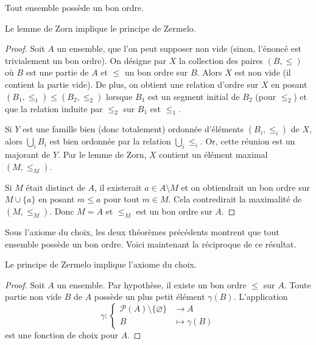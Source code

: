 \begin{definition}\label{ens : choix : zermelo}
	Tout ensemble possède un bon ordre. 
\end{definition}
\begin{proposition}
    
    Le lemme de Zorn implique le principe de Zermelo.
\end{proposition}
\begin{proof}
	Soit $A$ un ensemble, que l'on peut supposer non vide (sinon, l'énoncé est trivialement un bon ordre). On désigne par $X$ la collection des paires $(B, \leqslant)$ où $B$ est une partie de $A$ et $\leqslant$ un bon ordre sur $B$. Alors $X$ est non vide (il contient la partie vide). De plus, on obtient une relation d'ordre sur $X$ en posant $(B_1, \leqslant_1) \leqslant (B_2, \leqslant_2)$ lorsque $B_1$ est un segment initial de $B_2$ (pour $\leqslant_2$) et que la relation induite par $\leqslant_2$ sur $B_1$ est $\leqslant_1$.

	Si $Y$ est une famille bien (donc totalement) ordonnée d'éléments $(B_i, \leqslant_i)$ de $X$, alors $\bigcup_i B_i$ est bien ordonnée par la relation $\bigcup_i \leqslant_i$. Or, cette réunion est un majorant de $Y$. Par le lemme de Zorn, $X$ contient un élément maximal $(M, \leqslant_M)$.

	Si $M$ était distinct de $A$, il existerait $a \in A \setminus M$ et on obtiendrait un bon ordre sur $M \cup \{a\}$ en posant $m \leqslant a$ pour tout $m \in M$. Cela contredirait la maximalité de $(M, \leqslant_M)$. Donc $M = A$ et $\leqslant_M$ est un bon ordre sur $A$.
\end{proof}

Sous l'axiome du choix, les deux théorèmes précédents montrent que tout ensemble possède un bon ordre. Voici maintenant la réciproque de ce résultat.

\begin{theoreme}\label{ens : choix :zermelo_implique_choix}
	Le principe de Zermelo implique l'axiome du choix.
\end{theoreme}

\begin{proof}
	Soit $A$ un ensemble. Par hypothèse, il existe un bon ordre $\leqslant$ sur $A$. Toute partie non vide $B$ de $A$ possède un plus petit élément $\gamma(B)$. L'application
	\begin{equation*}
		\gamma : \begin{cases}
			\mathcal{P}(A) \setminus \{\varnothing\} & \longrightarrow A     \\
			B                                        & \longmapsto \gamma(B)
		\end{cases}
	\end{equation*}
	est une fonction de choix pour $A$.
\end{proof}

